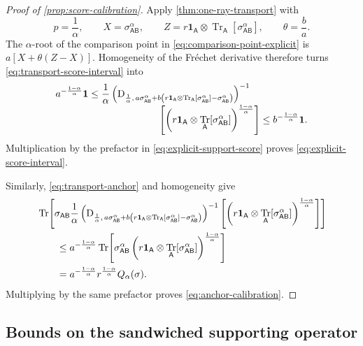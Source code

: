 \documentclass[11pt,reqno]{amsart}
\theoremstyle{definition}
\DeclareMathOperator{\Tr}{Tr}
\newcommand{\I}{\mathbf 1}
\newcommand{\A}{\mathsf{A}}
\newcommand{\B}{\mathsf{B}}
\begin{document}
\begin{proof}[Proof of \cref{prop:score-calibration}]
Apply \cref{thm:one-ray-transport} with
\[
 p=\frac1\alpha,
 \qquad
 X=\sigma_{\A\B}^\alpha,
 \qquad
 Z=r\I_{\A}\otimes\Tr_{\A}[\sigma_{\A\B}^\alpha],
 \qquad
 \theta=\frac ba.
\]
The $\alpha$-root of the comparison point in
\cref{eq:comparison-point-explicit} is $a[X+\theta(Z-X)]$.  Homogeneity of the Fr\'echet derivative therefore turns
\cref{eq:transport-score-interval} into
\begin{align}
 a^{-\frac{1-\alpha}{\alpha}}\I
 &\leq
 \frac1\alpha
 \left(
 \mathrm D_{\frac1\alpha,\,
 a\sigma_{\A\B}^\alpha
 +b\left(
 r\I_{\A}\otimes\Tr_{\A}[\sigma_{\A\B}^\alpha]
 -\sigma_{\A\B}^\alpha
 \right)}
 \right)^{-1}\notag\\[-1mm]
 &\hspace{25mm}\left[
 \left(
 r\I_{\A}\otimes\Tr_{\A}[\sigma_{\A\B}^\alpha]
 \right)^{\frac{1-\alpha}{\alpha}}
 \right]
 \leq b^{-\frac{1-\alpha}{\alpha}}\I.
 \label{eq:applied-score-interval}
\end{align}
Multiplication by the prefactor in
\cref{eq:explicit-support-score} proves
\cref{eq:explicit-score-interval}.

Similarly, \cref{eq:transport-anchor} and homogeneity give
\begin{align}
 &\Tr\!\left[
 \sigma_{\A\B}
 \frac1\alpha
 \left(
 \mathrm D_{\frac1\alpha,\,
 a\sigma_{\A\B}^\alpha
 +b\left(
 r\I_{\A}\otimes\Tr_{\A}[\sigma_{\A\B}^\alpha]
 -\sigma_{\A\B}^\alpha
 \right)}
 \right)^{-1}
 \left[
 \left(
 r\I_{\A}\otimes\Tr_{\A}[\sigma_{\A\B}^\alpha]
 \right)^{\frac{1-\alpha}{\alpha}}
 \right]
 \right]\notag\\
 &\qquad\leq
 a^{-\frac{1-\alpha}{\alpha}}
 \Tr\!\left[
 \sigma_{\A\B}^\alpha
 \left(
 r\I_{\A}\otimes\Tr_{\A}[\sigma_{\A\B}^\alpha]
 \right)^{\frac{1-\alpha}{\alpha}}
 \right]\notag\\
 &\qquad=
 a^{-\frac{1-\alpha}{\alpha}}r^{\frac{1-\alpha}{\alpha}}Q_\alpha(\sigma).
 \label{eq:applied-anchor-calibration}
\end{align}
Multiplying by the same prefactor proves
\cref{eq:anchor-calibration}.
\end{proof}

\subsection{Bounds on the sandwiched supporting operator} \label{sec:sand_technical}
\end{document}
